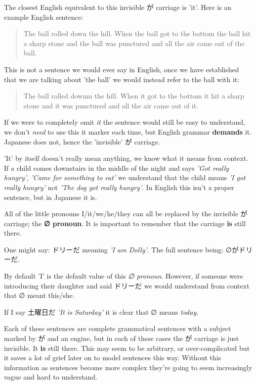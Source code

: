\documentclass[11pt]{article}
\begin{document}
The closest English equivalent to this invisible が carriage is 'it'. Here is an example English sentence:
\begin{quote}
The ball rolled down the hill. When the ball got to the bottom the ball hit a sharp stone and the ball was punctured and all the air came out of the ball.
\end{quote}

This is not a sentence we would ever say in English, once we have established that we are talking about 'the ball' we would instead refer to the ball with it:
\begin{quote}
The ball rolled downm the hill. When it got to the bottom it hit a sharp stone and it was punctured and all the air came out of it.
\end{quote}

If we were to completely omit \emph{it} the sentence would still be easy to understand, we don't \emph{need} to use this it marker each time, but English grammar \textbf{demands} it. Japanese does not, hence the 'invisible' が carriage.

'It' by itself doesn't really mean anything, we know what it means from context. If a child comes downstairs in the middle of the night and says \emph{'Got really hungry'}, \emph{'Came for something to eat'} we understand that the child means \emph{'I got really hungry'} not \emph{'The dog got really hungry'}. In English this isn't a proper sentence, but in Japanese it is.

All of the little pronouns I/it/we/he/they can all be replaced by the invisible が carriage; the \textbf{∅ pronoun}. It is important to remember that the carriage \textbf{is} still there.

One might say: ドリーだ meaning \emph{'I am Dolly'}. The full sentence being: ∅がドリーだ.

By default 'I' is the default value of this \emph{∅ pronoun}. However, if someone were introducing their daughter and said ドリーだ we would understand from context that ∅ meant this/she.

If I say 土曜日だ \emph{'It is Saturday'} it is clear that ∅ means \emph{today}.

Each of these sentences are complete grammatical sentences with a subject marked by が and an engine, but in each of these cases the が carriage is just invisible. It \textbf{is} still there. This may seem to be arbitrary, or over-complicated but it saves a lot of grief later on to model sentences this way. Without this information as sentences become more complex they're going to seem increasingly vague and hard to understand.
\end{document}
